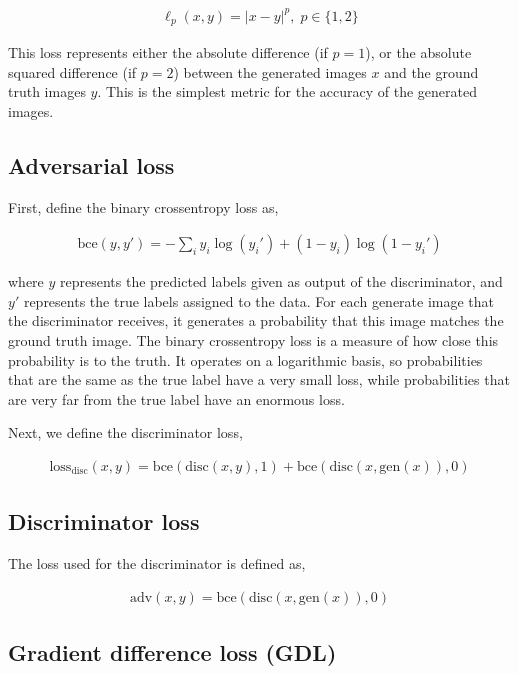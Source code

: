 \documentclass{article}
\begin{document}
\begin{align*}
    \ell_p(x, y) = |x - y|^p,\; p \in \big\{1, 2\big\}
\end{align*}

This loss represents either the absolute difference (if $p = 1$), or the absolute squared difference (if $p = 2$) between the generated images $x$ and the ground truth images $y$. This is the simplest metric for the accuracy of the generated images.

\subsection{Adversarial loss}

First, define the binary crossentropy loss as,

\begin{align*}
    \mathrm{bce}(y, y') = -\sum_i y_i\log(y_i') + (1-y_i)
    \log(1-y_i')
\end{align*}

where $y$ represents the predicted labels given as output of the discriminator, and $y'$ represents the true labels assigned to the data. For each generate image that the discriminator receives, it generates a probability that this image matches the ground truth image. The binary crossentropy loss is a measure of how close this probability is to the truth. It operates on a logarithmic basis, so probabilities that are the same as the true label have a very small loss, while probabilities that are very far from the true label have an enormous loss.

Next, we define the discriminator loss,

\begin{align*}
    \mathrm{loss}_{\mathrm{disc}}(x, y) =
    \mathrm{bce}(\mathrm{disc}(x, y), 1) +
    \mathrm{bce}(\mathrm{disc}(x, \mathrm{gen}(x)), 0)
\end{align*}

\subsection{Discriminator loss}

The loss used for the discriminator is defined as,

\begin{align*}
    \mathrm{adv}(x, y) =
    \mathrm{bce}(\mathrm{disc}(x, \mathrm{gen}(x)), 0)
\end{align*}

\subsection{Gradient difference loss (GDL)}
\end{document}
